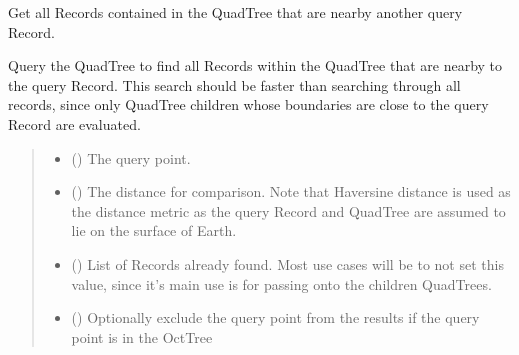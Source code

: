 \documentclass[letterpaper,10pt,english]{sphinxmanual}
\begin{document}
\begin{fulllineitems}
\begin{fulllineitems}
\label{\detokenize{quadtree:GeoSpatialTools.quadtree.QuadTree.nearby_points}}
\pysigstartsignatures
\pysiglinewithargsret
{}
{\sphinxparamcomma {}\sphinxparamcomma {}\sphinxparamcomma {}}
{}
\pysigstopsignatures
\sphinxAtStartPar
Get all Records contained in the QuadTree that are nearby
another query Record.

\sphinxAtStartPar
Query the QuadTree to find all Records within the QuadTree that
are nearby to the query Record. This search should be faster
than searching through all records, since only QuadTree children whose
boundaries are close to the query Record are evaluated.
\begin{quote}\begin{description}
\begin{itemize}
\item {}
\sphinxAtStartPar
{} ({\hyperref[\detokenize{record:GeoSpatialTools.record.Record}]{}}) \textendash{} The query point.

\item {}
\sphinxAtStartPar
{} () \textendash{} The distance for comparison. Note that Haversine distance is used
as the distance metric as the query Record and QuadTree are
assumed to lie on the surface of Earth.

\item {}
\sphinxAtStartPar
{} (\sphinxstyleliteralemphasis{\sphinxupquote{ | }}) \textendash{} List of Records already found. Most use cases will be to
not set this value, since it’s main use is for passing onto the
children QuadTrees.

\item {}
\sphinxAtStartPar
{} () \textendash{} Optionally exclude the query point from the results if the query
point is in the OctTree


\end{itemize}
\end{description}
\end{quote}
\end{fulllineitems}
\end{fulllineitems}
\end{document}
